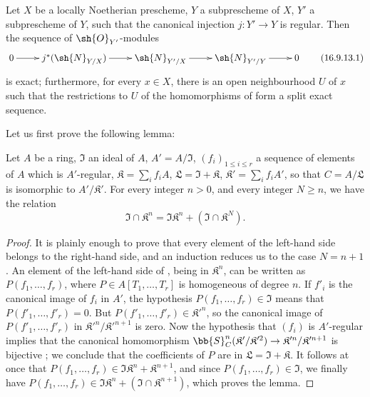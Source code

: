 \begin{proposition}[16.9.13]
\label{IV.16.9.13}
Let $X$ be a locally Noetherian prescheme, $Y$ a subprescheme of $X$, $Y'$ a subprescheme of $Y$, such that the canonical injection $j:Y' \to Y$ is regular. 
Then the sequence of $\sh{O}_{Y'}$-modules
\[
  \label{IV.16.9.13.1}
  \xymatrix{
    0 \ar[r] & j^*(\sh{N}_{Y/X}) \ar[r] & \sh{N}_{Y'/X} \ar[r] & \sh{N}_{Y'/Y} \ar[r] & 0
  }
  \tag{16.9.13.1}
\]
is exact;
furthermore, for every $x \in X$, there is an open neighbourhood $U$ of $x$ such that the restrictions to $U$ of the homomorphisms of  form a split exact sequence.
\end{proposition}

Let us first prove the following lemma:

\begin{lemma}[16.9.13.2]
\label{IV.16.9.13.2}
Let $A$ be a ring, $\mathfrak{I}$ an ideal of $A$, $A' = A/\mathfrak{I}$, $(f_i)_{1 \leq i \leq r}$ a sequence of elements of $A$ which is $A'$-regular, $\mathfrak{K} = \sum_i f_i A$, $\mathfrak{L} = \mathfrak{I} + \mathfrak{K}$, $\mathfrak{K}' = \sum_i f_i A'$, so that $C = A/\mathfrak{L}$ is isomorphic to $A'/\mathfrak{K}'$.
For every integer $n > 0$, and every integer $N \geq n$, we have the relation
\[
  \label{IV.16.9.13.3}
  \mathfrak{I} \cap \mathfrak{K}^n = \mathfrak{I}\mathfrak{K}^n + (\mathfrak{I} \cap \mathfrak{K}^N).
  \tag{16.9.13.3}
\]
\end{lemma}

\begin{proof}
It is plainly enough to prove that every element of the left-hand side belongs to the right-hand side, and an induction reduces us to the case $N = n + 1$.
An element of the left-hand side of , being in $\mathfrak{K}^n$, can be written as $P(f_1, \dots, f_r)$, where $P \in A[T_1, \dots, T_r]$ is homogeneous of degree $n$.
If $f'_i$ is the canonical image of $f_i$ in $A'$, the hypothesis $P(f_1, \dots, f_r) \in \mathfrak{I}$ means that $P(f'_1, \dots, f'_r) = 0$.
But $P(f'_1, \dots, f'_r) \in \mathfrak{K}'^n$, so the canonical image of $P(f'_1, \dots, f'_r)$ in $\mathfrak{K}'^n/\mathfrak{K}'^{n+1}$ is zero.
Now the hypothesis that $(f_i)$ is $A'$-regular implies that the canonical homomorphism $\bb{S}_C^n(\mathfrak{K}'/\mathfrak{K}'^2) \to \mathfrak{K}'^n/\mathfrak{K}'^{n+1}$ is bijective ;
we conclude that the coefficients of $P$ are in $\mathfrak{L} = \mathfrak{I} + \mathfrak{K}$.
It follows at once that $P(f_1, \dots, f_r) \in \mathfrak{I}\mathfrak{K}^n + \mathfrak{K}^{n+1}$, and since $P(f_1, \dots, f_r) \in \mathfrak{I}$, we finally have $P(f_1, \dots, f_r) \in \mathfrak{I}\mathfrak{K}^n + (\mathfrak{I} \cap \mathfrak{K}^{n+1})$, which proves the lemma.
\end{proof}

